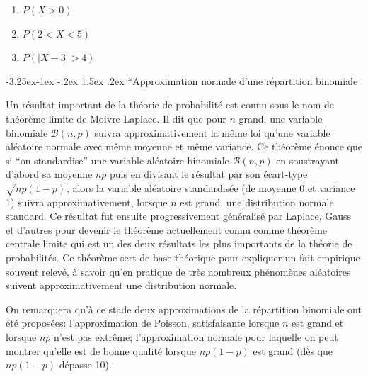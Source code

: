 \documentclass[]{book}
\makeatletter
\renewcommand\subsection{\@startsection{subsection}{2}{\z@}%
                                     {-3.25ex\@plus -1ex \@minus -.2ex}%
                                     {1.5ex \@plus .2ex}%
                                     {\normalfont\large\bfseries\color{Violet}}}
\theoremstyle{magentacolor}
\theoremstyle{proprie}
\theoremstyle{exstyle}
\theoremstyle{exostyle}
\theoremstyle{definition}
\theoremstyle{definition}
\theoremstyle{definition}
\theoremstyle{remark}
\makeatother
\begin{document}
\begin{enumerate}
\def\labelenumi{\arabic{enumi}.}
\item
  \(P(X > 0)\)
\item
  \(P(2 < X < 5)\)
\item
  \(P(|X-3| > 4)\)
\end{enumerate}

\hypertarget{approximation-normale-dune-repartition-binomiale}{%
\subsection*{Approximation normale d'une répartition binomiale}\label{approximation-normale-dune-repartition-binomiale}}

Un résultat important de la théorie de probabilité est connu sous le nom
de théorème limite de Moivre-Laplace. Il dit que pour \(n\) grand, une
variable binomiale \(\mathcal{B}(n,p)\) suivra approximativement la même
loi qu'une variable aléatoire normale avec même moyenne et même
variance. Ce théorème énonce que si ``on standardise'' une variable
aléatoire binomiale \(\mathcal{B}(n,p)\) en soustrayant d'abord sa moyenne
\(np\) puis en divisant le résultat par son écart-type \(\sqrt{np(1-p)}\),
alors la variable aléatoire standardisée (de moyenne 0 et variance 1)
suivra approximativement, lorsque \(n\) est grand, une distribution
normale standard. Ce résultat fut ensuite progressivement généralisé par
Laplace, Gauss et d'autres pour devenir le théorème actuellement connu
comme théorème centrale limite qui est un des deux résultats les plus
importants de la théorie de probabilités. Ce théorème sert de base
théorique pour expliquer un fait empirique souvent relevé, à savoir
qu'en pratique de très nombreux phénomènes aléatoires suivent
approximativement une distribution normale.

On remarquera qu'à ce stade deux approximations de la répartition
binomiale ont été proposées: l'approximation de Poisson, satisfaisante
lorsque \(n\) est grand et lorsque \(np\) n'est pas extrême; l'approximation
normale pour laquelle on peut montrer qu'elle est de bonne qualité
lorsque \(np(1-p)\) est grand (dès que \(np(1-p)\) dépasse 10).
\end{document}
